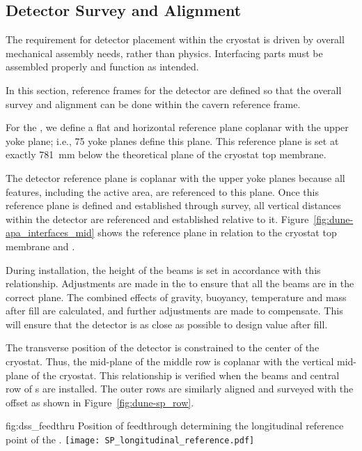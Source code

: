 \subsection{Detector Survey and Alignment}
\label{sec:fdsp-coord-integ-survey}
The requirement for detector placement within the cryostat is driven
by overall mechanical assembly needs, rather than physics.  %
Interfacing
parts %
must be assembled properly and function as intended.


In this section, reference frames for the detector are defined so that the
overall survey and alignment can be done within the cavern reference
frame. 


For the , we define a flat and horizontal 
reference plane 
coplanar with the upper  yoke plane; i.e.,
75 yoke planes define this %
plane. This
reference plane is set at exactly \SI{781}{mm} below the theoretical plane
of the cryostat top membrane.


The detector reference plane is coplanar with the upper 
yoke planes because all features, including the active area, are
referenced to this plane.   Once this reference plane is defined and
established through survey, all vertical distances within the detector
are referenced and established relative to it. %
Figure~\ref{fig:dune-apa_interfaces_mid} shows the reference plane in
relation to the cryostat top membrane and .


During installation, the height of the  beams is set in
accordance with this relationship. Adjustments are made in the
 to ensure that all the beams are in the correct plane. The
combined effects of gravity, buoyancy, temperature and  mass after
fill are calculated, and further adjustments are made to
compensate. This will ensure that the detector is as close as possible
to design value after fill. 


The transverse position of the detector is constrained to the center
of the cryostat. Thus, the mid-plane of the middle row  is
coplanar with the vertical mid-plane of the cryostat. This
relationship is verified when the  beams and central row of
s are installed. The outer rows are similarly aligned and
surveyed with the offset as shown in Figure~\ref{fig:dune-sp_row}.
\begin{dunefigure}{fig:dss_feedthru}
  {Position of feedthrough determining the longitudinal reference point of the .}
  \texttt{[image: SP\_longitudinal\_reference.pdf]}
\end{dunefigure}


